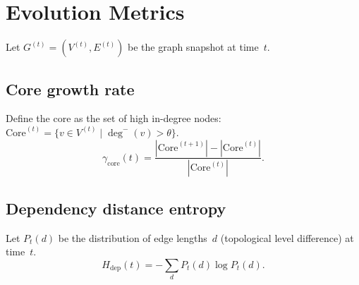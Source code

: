 \section{Evolution Metrics}

Let $G^{(t)} = (V^{(t)}, E^{(t)})$ be the graph snapshot at time~$t$.

\subsection{Core growth rate}

\begin{definition}
Define the core as the set of high in-degree nodes:
$\mathrm{Core}^{(t)} = \{v \in V^{(t)} \mid \deg^-(v) > \theta\}$.
\[
  \gamma_{\mathrm{core}}(t) = \frac{|\mathrm{Core}^{(t+1)}| - |\mathrm{Core}^{(t)}|}{|\mathrm{Core}^{(t)}|}.
\]
\end{definition}

\subsection{Dependency distance entropy}

\begin{definition}
Let $P_t(d)$ be the distribution of edge lengths~$d$ (topological level difference) at time~$t$.
\[
  H_{\mathrm{dep}}(t) = -\sum_d P_t(d) \log P_t(d).
\]
\end{definition}

